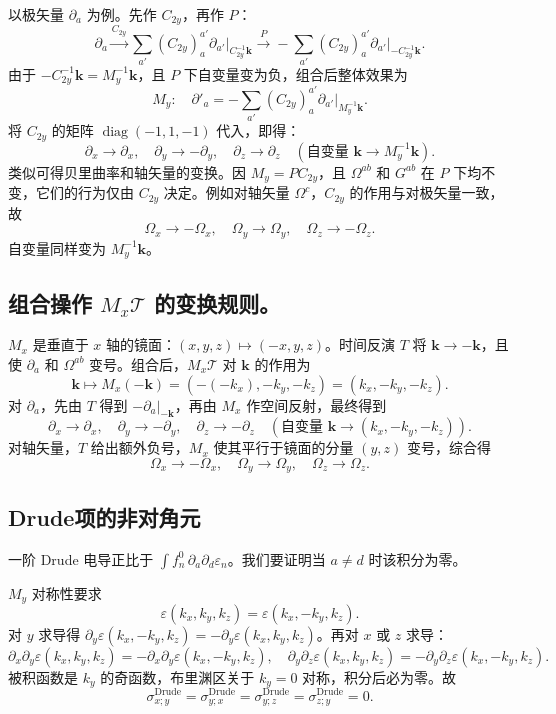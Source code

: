 以极矢量 \(\partial_a\) 为例。先作 \(C_{2y}\)，再作 \(P\)：
\[
\partial_{a} \xrightarrow{C_{2y}} \sum_{a'} (C_{2y})_{a}^{a'} \partial_{a'} \big|_{C_{2y}^{-1}\mathbf{k}}
\xrightarrow{P} -\sum_{a'} (C_{2y})_{a}^{a'} \partial_{a'} \big|_{-C_{2y}^{-1}\mathbf{k}} .
\]
由于 \(-C_{2y}^{-1}\mathbf{k} = M_y^{-1}\mathbf{k}\)，且 \(P\) 下自变量变为负，组合后整体效果为
\[
M_y: \quad \partial'_{a} = -\sum_{a'} (C_{2y})_{a}^{a'} \partial_{a'} \big|_{M_y^{-1}\mathbf{k}} .
\]
将 \(C_{2y}\) 的矩阵 \(\operatorname{diag}(-1,1,-1)\) 代入，即得：
\[
\partial_x \to \partial_x, \quad \partial_y \to -\partial_y, \quad \partial_z \to \partial_z \quad (\text{自变量 } \mathbf{k}\to M_y^{-1}\mathbf{k}).
\]
类似可得贝里曲率和轴矢量的变换。因 \(M_y = P C_{2y}\)，且 \(\Omega^{ab}\) 和 \(G^{ab}\) 在 \(P\) 下均不变，它们的行为仅由 \(C_{2y}\) 决定。例如对轴矢量 \(\Omega^c\)，\(C_{2y}\) 的作用与对极矢量一致，故
\[
\Omega_x \to -\Omega_x,\quad \Omega_y \to \Omega_y,\quad \Omega_z \to -\Omega_z .
\]
自变量同样变为 \(M_y^{-1}\mathbf{k}\)。

\subsection{组合操作 \(M_x\mathcal{T}\) 的变换规则。}
\(M_x\) 是垂直于 \(x\) 轴的镜面：\((x,y,z)\mapsto (-x,y,z)\)。时间反演 \(T\) 将 \(\mathbf{k}\to -\mathbf{k}\)，且使 \(\partial_a\) 和 \(\Omega^{ab}\) 变号。组合后，\(M_x\mathcal{T}\) 对 \(\mathbf{k}\) 的作用为
\[
\mathbf{k} \mapsto M_x(-\mathbf{k}) = (-(-k_x), -k_y, -k_z) = (k_x, -k_y, -k_z).
\]
对 \(\partial_a\)，先由 \(T\) 得到 \(-\partial_a|_{-\mathbf{k}}\)，再由 \(M_x\) 作空间反射，最终得到
\[
\partial_x \to \partial_x,\quad \partial_y \to -\partial_y,\quad \partial_z \to -\partial_z \quad (\text{自变量 } \mathbf{k}\to (k_x,-k_y,-k_z)).
\]
对轴矢量，\(T\) 给出额外负号，\(M_x\) 使其平行于镜面的分量 \((y,z)\) 变号，综合得
\[
\Omega_x \to -\Omega_x,\quad \Omega_y \to \Omega_y,\quad \Omega_z \to \Omega_z .
\]

\subsection{Drude项的非对角元}
一阶 Drude 电导正比于 \(\int f_n^0\,\partial_a\partial_d\varepsilon_n\)。我们要证明当 \(a\neq d\) 时该积分为零。

\(M_y\) 对称性要求
\[
\varepsilon(k_x,k_y,k_z) = \varepsilon(k_x,-k_y,k_z).
\]
对 \(y\) 求导得 \(\partial_y\varepsilon(k_x,-k_y,k_z) = -\partial_y\varepsilon(k_x,k_y,k_z)\)。再对 \(x\) 或 \(z\) 求导：
\[
\partial_x\partial_y\varepsilon(k_x,k_y,k_z) = -\partial_x\partial_y\varepsilon(k_x,-k_y,k_z),
\quad
\partial_y\partial_z\varepsilon(k_x,k_y,k_z) = -\partial_y\partial_z\varepsilon(k_x,-k_y,k_z).
\]
被积函数是 \(k_y\) 的奇函数，布里渊区关于 \(k_y=0\) 对称，积分后必为零。故
\[
\sigma_{x;y}^{\mathrm{Drude}} = \sigma_{y;x}^{\mathrm{Drude}} = \sigma_{y;z}^{\mathrm{Drude}} = \sigma_{z;y}^{\mathrm{Drude}} = 0.
\]

